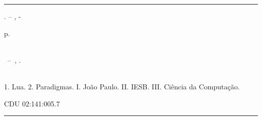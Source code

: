 \documentclass[
12pt, %
openright, %
oneside, %
a4paper, %
english, %
brazil, %
]{abntex2}
\begin{document}
\frenchspacing


\imprimircapa

\imprimirfolhaderosto*


%
\begin{fichacatalografica}
\vspace*{\fill}	%
\hrule	%
\begin{center}	%
\begin{minipage}[c]{12.5cm}	%

\imprimirautor

\hspace{0.5cm} \imprimirtitulo. --
\imprimirlocal, \imprimirdata-

\hspace{0.5cm} \pageref{LastPage} p.\\

\hspace{0.5cm} \imprimirorientadorRotulo~\imprimirorientador\\

\hspace{0.5cm}
\parbox[t]{\textwidth}{\imprimirtipotrabalho~--~\imprimirinstituicao,
\imprimirdata.}\\

\hspace{0.5cm}
1. Lua.
2. Paradigmas.
I. João Paulo.
II. IESB.
III. Ciência da Computação.

\hspace{8.75cm} CDU 02:141:005.7\\

\end{minipage}
\end{center}
\hrule
\end{fichacatalografica}
\end{document}
